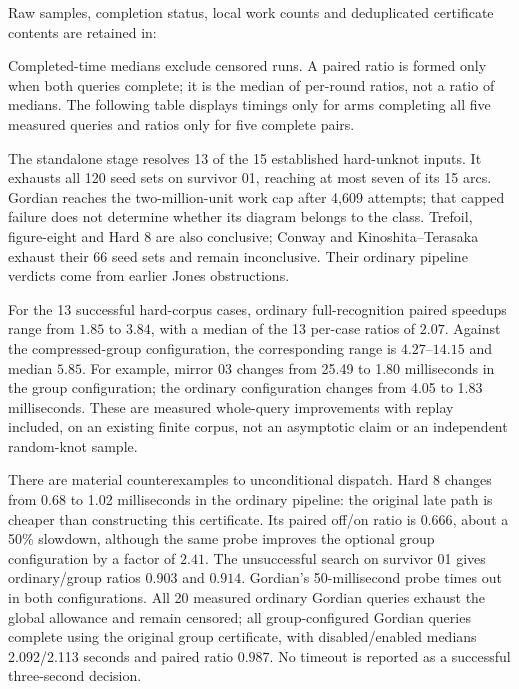 Raw samples, completion status, local work counts and deduplicated certificate
contents are retained in:
\begin{center}\small
{}
\end{center}
Completed-time medians exclude censored runs. A paired ratio is formed only
when both queries complete; it is the median of per-round ratios, not a ratio
of medians. The following table displays timings only for arms completing
all five measured queries and ratios only for five complete pairs.


The standalone stage resolves 13 of the 15 established hard-unknot inputs.
It exhausts all 120 seed sets on survivor 01, reaching at most seven of its
15 arcs. Gordian reaches the two-million-unit work cap after 4,609 attempts;
that capped failure does not determine whether its diagram belongs to the
class. Trefoil, figure-eight and Hard 8 are also conclusive; Conway and
Kinoshita--Terasaka exhaust their 66 seed sets and remain inconclusive.
Their ordinary pipeline verdicts come from earlier Jones obstructions.

For the 13 successful hard-corpus cases, ordinary full-recognition paired
speedups range from $1.85$ to $3.84$, with a median of the 13 per-case ratios
of $2.07$. Against the compressed-group configuration, the corresponding
range is $4.27$--$14.15$ and median $5.85$. For example, mirror 03 changes
from 25.49 to 1.80 milliseconds in the group configuration; the ordinary
configuration changes from 4.05 to 1.83 milliseconds. These are measured
whole-query improvements with replay included, on an existing finite corpus,
not an asymptotic claim or an independent random-knot sample.

There are material counterexamples to unconditional dispatch. Hard 8 changes
from 0.68 to 1.02 milliseconds in the ordinary pipeline: the original late
path is cheaper than constructing this certificate. Its paired off/on ratio
is $0.666$, about a 50\% slowdown, although the same probe improves the
optional group configuration by a factor of $2.41$. The unsuccessful search
on survivor 01 gives ordinary/group ratios $0.903$ and $0.914$. Gordian's
50-millisecond probe times out in both configurations. All 20 measured
ordinary Gordian queries exhaust the global allowance and remain censored;
all group-configured Gordian queries complete using the original group
certificate, with disabled/enabled medians 2.092/2.113 seconds and paired
ratio $0.987$. No timeout is reported as a successful three-second decision.

